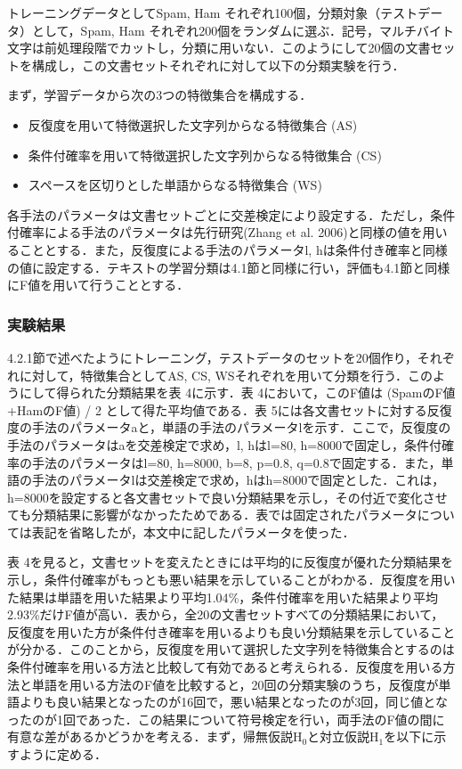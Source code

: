\documentclass[japanese]{jnlp_1.4}
\begin{document}
トレーニングデータとしてSpam, Ham 
それぞれ100個，分類対象（テストデータ）として，Spam, Ham 
それぞれ200個をランダムに選ぶ．記号，マルチバイト文字は前処理段階でカットし，分類に用いない．このようにして20個の文書セットを構成し，この文書セットそれぞれに対して以下の分類実験を行う．

まず，学習データから次の3つの特徴集合を構成する．

\begin{itemize}
\item 反復度を用いて特徴選択した文字列からなる特徴集合 (AS) 
\item 条件付確率を用いて特徴選択した文字列からなる特徴集合 (CS)
\item スペースを区切りとした単語からなる特徴集合 (WS)
\end{itemize}

各手法のパラメータは文書セットごとに交差検定により設定する．ただし，条件付確率による手法のパラメータは先行研究(Zhang 
et al. 
2006)と同様の値を用いることとする．また，反復度による手法のパラメータl, hは条件付き確率と同様の値に設定する．テキストの学習分類は4.1節と同様に行い，評価も4.1節と同様にF値を用いて行うこととする．


\subsubsection{実験結果}

4.2.1節で述べたようにトレーニング，テストデータのセットを20個作り，それぞれに対して，特徴集合としてAS, CS, WSそれぞれを用いて分類を行う．このようにして得られた分類結果を表 
4に示す．表 4において，このF値は (SpamのF値+HamのF値) / 2 として得た平均値である．表 
5には各文書セットに対する反復度の手法のパラメータaと，単語の手法のパラメータlを示す．ここで，反復度の手法のパラメータはaを交差検定で求め，l, hはl=80, h=8000で固定し，条件付確率の手法のパラメータはl=80, h=8000, b=8, p=0.8, q=0.8で固定する．また，単語の手法のパラメータlは交差検定で求め，hはh=8000で固定とした．これは，h=8000を設定すると各文書セットで良い分類結果を示し，その付近で変化させても分類結果に影響がなかったためである．表では固定されたパラメータについては表記を省略したが，本文中に記したパラメータを使った．


表 4を見ると，文書セットを変えたときには平均的に反復度が優れた分類結果を示し，条件付確率がもっとも悪い結果を示していることがわかる．反復度を用いた結果は単語を用いた結果より平均1.04{\%}，条件付確率を用いた結果より平均2.93{\%}だけF値が高い．表から，全20の文書セットすべての分類結果において，反復度を用いた方が条件付き確率を用いるよりも良い分類結果を示していることが分かる．このことから，反復度を用いて選択した文字列を特徴集合とするのは条件付確率を用いる方法と比較して有効であると考えられる．反復度を用いる方法と単語を用いる方法のF値を比較すると，20回の分類実験のうち，反復度が単語よりも良い結果となったのが16回で，悪い結果となったのが3回，同じ値となったのが1回であった．この結果について符号検定を行い，両手法のF値の間に有意な差があるかどうかを考える．まず，帰無仮説H$_{0}$と対立仮説H$_{1}$を以下に示すように定める．
\end{document}
